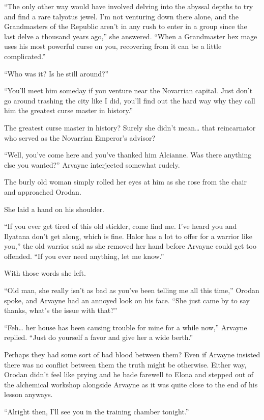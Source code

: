\documentclass[a4paper,10pt]{book}
\begin{document}
“The only other way would have involved delving into the abyssal depths to try and find a rare talyotus jewel. I’m not venturing down there alone, and the Grandmasters of the Republic aren't in any rush to enter in a group since the last delve a thousand years ago,” she answered. “When a Grandmaster hex mage uses his most powerful curse on you, recovering from it can be a little complicated.”\par
“Who was it? Is he still around?”\par
“You’ll meet him someday if you venture near the Novarrian capital. Just don’t go around trashing the city like I did, you’ll find out the hard way why they call him the greatest curse master in history.”\par
The greatest curse master in history? Surely she didn’t mean… that reincarnator who served as the Novarrian Emperor’s advisor?\par
“Well, you’ve come here and you’ve thanked him Alcianne. Was there anything else you wanted?” Arvayne interjected somewhat rudely.\par
The burly old woman simply rolled her eyes at him as she rose from the chair and approached Orodan.\par
She laid a hand on his shoulder.\par
“If you ever get tired of this old stickler, come find me. I’ve heard you and Ilyatana don’t get along, which is fine. Halor has a lot to offer for a warrior like you,” the old warrior said as she removed her hand before Arvayne could get too offended. “If you ever need anything, let me know.”\par
With those words she left.\par
“Old man, she really isn’t as bad as you’ve been telling me all this time,” Orodan spoke, and Arvayne had an annoyed look on his face. “She just came by to say thanks, what’s the issue with that?”\par
“Feh… her house has been causing trouble for mine for a while now,” Arvayne replied. “Just do yourself a favor and give her a wide berth.”\par
Perhaps they had some sort of bad blood between them? Even if Arvayne insisted there was no conflict between them the truth might be otherwise. Either way, Orodan didn’t feel like prying and he bade farewell to Elona and stepped out of the alchemical workshop alongside Arvayne as it was quite close to the end of his lesson anyways.\par
“Alright then, I’ll see you in the training chamber tonight.”\par
\end{document}
